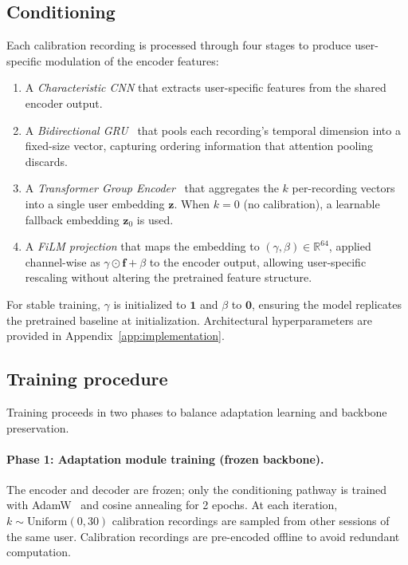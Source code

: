 \documentclass[10pt]{article}
\begin{document}
\subsection{Conditioning}
\label{sec:conditioning}

Each calibration recording is processed through four stages to produce user-specific modulation of the encoder features:

\begin{enumerate}[leftmargin=*,itemsep=2pt,topsep=2pt]
    \item A \emph{Characteristic CNN} that extracts user-specific features from the shared encoder output.
    \item A \emph{Bidirectional GRU}~\citep{cho2014gru} that pools each recording's temporal dimension into a fixed-size vector, capturing ordering information that attention pooling discards.
    \item A \emph{Transformer Group Encoder}~\citep{lee2019set} that aggregates the $k$ per-recording vectors into a single user embedding $\mathbf{z}$. When $k{=}0$ (no calibration), a learnable fallback embedding $\mathbf{z}_0$ is used.
    \item A \emph{FiLM projection} that maps the embedding to $(\gamma, \beta) \in \mathbb{R}^{64}$, applied channel-wise as $\gamma \odot \mathbf{f} + \beta$ to the encoder output, allowing user-specific rescaling without altering the pretrained feature structure.
\end{enumerate}

For stable training, $\gamma$ is initialized to $\mathbf{1}$ and $\beta$ to $\mathbf{0}$, ensuring the model replicates the pretrained baseline at initialization. Architectural hyperparameters are provided in Appendix~\ref{app:implementation}.

\subsection{Training procedure}
\label{sec:training}

Training proceeds in two phases to balance adaptation learning and backbone preservation.

\paragraph{Phase 1: Adaptation module training (frozen backbone).}
The encoder and decoder are frozen; only the conditioning pathway is trained with AdamW~\citep{loshchilov2019decoupled} and cosine annealing for 2 epochs. At each iteration, $k \sim \text{Uniform}(0, 30)$ calibration recordings are sampled from other sessions of the same user. Calibration recordings are pre-encoded offline to avoid redundant computation.
\end{document}
